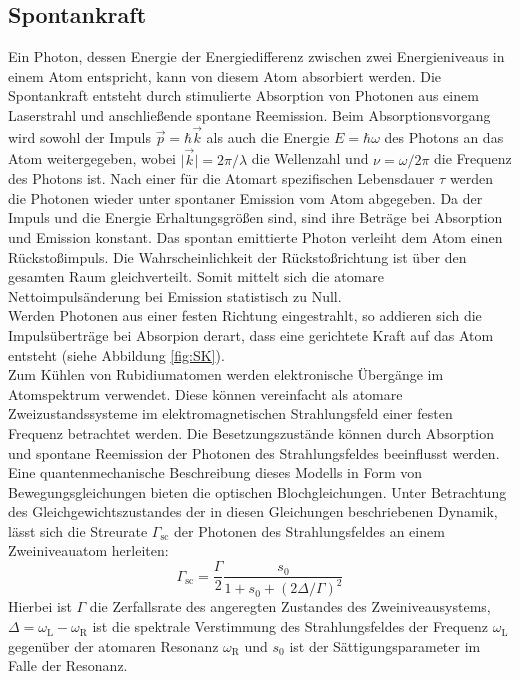 \documentclass[
class=book,
accentcolor=1b,
custommargins=geometry,
fontsize=11pt,
thesis={type=Versuchsanleitung},
ruledheaders=all,
headline=false,
instbox=false,
marginpar=false,
title=small,
ignore-missing-data=true,
twoside=false,
logofile=apqdesign/tuda_logo.pdf,
pdfa=false %
]{apqpub}
\begin{document}
				\subsection{Spontankraft}\label{ssec:SK}		
				Ein Photon, dessen Energie der Energiedifferenz zwischen zwei Energieniveaus in einem Atom entspricht, kann von diesem Atom absorbiert werden. Die Spontankraft entsteht durch stimulierte Absorption von Photonen aus einem Laserstrahl und anschließende spontane Reemission. 
				Beim Absorptionsvorgang wird sowohl der Impuls $\vec{p} = \hbar \vec{k}$ als auch die Energie $E = \hbar \omega$ des Photons an das Atom weitergegeben, wobei $\vert \vec{k} \vert = 2\pi/\lambda$ die Wellenzahl und $\nu = \omega/2\pi$ die Frequenz des Photons ist. 
				Nach einer für die Atomart spezifischen Lebensdauer $\tau$ werden die Photonen
				wieder unter spontaner Emission vom Atom abgegeben. 
				Da der Impuls und die Energie Erhaltungsgrößen sind, sind ihre Beträge bei Absorption und Emission konstant. 
				Das spontan emittierte Photon verleiht dem Atom einen Rückstoßimpuls. Die Wahrscheinlichkeit der Rückstoßrichtung ist über den gesamten Raum gleichverteilt. Somit mittelt sich die atomare Nettoimpulsänderung bei Emission statistisch zu Null.\\ 
				Werden Photonen aus einer festen Richtung eingestrahlt, so addieren sich die Impulsüberträge bei Absorpion derart, dass eine gerichtete Kraft auf das Atom entsteht (siehe Abbildung \ref{fig:SK}).\\
				Zum Kühlen von Rubidiumatomen werden elektronische Übergänge im Atomspektrum verwendet. 
				Diese können vereinfacht als atomare Zweizustandssysteme im elektromagnetischen Strahlungsfeld einer festen Frequenz
				betrachtet werden. 
				Die Besetzungszustände können durch Absorption und spontane Reemission der Photonen des
				Strahlungsfeldes beeinflusst werden. 
				Eine quantenmechanische Beschreibung dieses Modells in Form von Bewegungsgleichungen bieten die optischen Blochgleichungen. Unter Betrachtung des Gleichgewichtszustandes der in diesen Gleichungen beschriebenen Dynamik, lässt sich die Streurate $\varGamma_{\text{sc}}$ der Photonen des Strahlungsfeldes an einem Zweiniveauatom herleiten:			
				\begin{equation}\label{equa:6-1}
				\varGamma_{\text{sc}} = \frac{\varGamma}{2} \frac{s_0}{1+s_0+(2\varDelta/\varGamma)^2}
				\end{equation}				
				Hierbei ist $\varGamma$ die Zerfallsrate des angeregten Zustandes des Zweiniveausystems, $\varDelta = \omega_{\text{L}} - \omega_{\text{R}} $ ist die spektrale Verstimmung des Strahlungsfeldes der Frequenz $\omega_{\text{L}}$ gegenüber der atomaren Resonanz $\omega_{\text{R}}$ und $s_0$ ist der Sättigungsparameter im Falle der Resonanz. 
\end{document}
